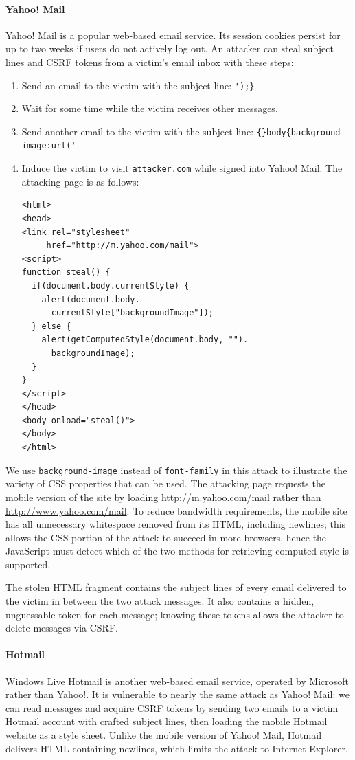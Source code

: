 \documentclass{acm_proc_article-sp}
\begin{document}
\paragraph{Yahoo! Mail}
Yahoo! Mail is a popular web-based email service.  Its session cookies
persist for up to two weeks if users do not actively log out.  An
attacker can steal subject lines and CSRF tokens from a victim's email
inbox with these steps:

\begin{enumerate}
\item Send an email to the victim with the subject line:
  \verb|');}|
\item Wait for some time while the victim receives other messages.
\item Send another email to the victim with the subject line:
  \verb|{}body{background-image:url('|
\item Induce the victim to visit \texttt{attacker.com} while signed
  into Yahoo! Mail.  The attacking page is as follows:
\begin{verbatim}
<html>
<head>
<link rel="stylesheet"
     href="http://m.yahoo.com/mail">
<script>
function steal() {
  if(document.body.currentStyle) {
    alert(document.body.
      currentStyle["backgroundImage"]);
  } else {
    alert(getComputedStyle(document.body, "").
      backgroundImage);
  }
}
</script>
</head>
<body onload="steal()">
</body>
</html>
\end{verbatim}
\end{enumerate}

We use \texttt{background-image} instead of \texttt{font-family} in
this attack to illustrate the variety of CSS properties that can be
used.  The attacking page requests the mobile version of the site by
loading \url{http://m.yahoo.com/mail} rather than
\url{http://www.yahoo.com/mail}.  To reduce bandwidth requirements,
the mobile site has all unnecessary whitespace removed from its HTML,
including newlines; this allows the CSS portion of the attack to
succeed in more browsers, hence the JavaScript must detect which of
the two methods for retrieving computed style is supported.

The stolen HTML fragment contains the subject lines of every email
delivered to the victim in between the two attack messages.  It also
contains a hidden, unguessable token for each message; knowing these
tokens allows the attacker to delete messages via CSRF.

\paragraph{Hotmail}
Windows Live Hotmail is another web-based email service, operated by
Microsoft rather than Yahoo!.  It is vulnerable to nearly the same
attack as Yahoo! Mail: we can read messages and acquire CSRF tokens by
sending two emails to a victim Hotmail account with crafted subject
lines, then loading the mobile Hotmail website as a style sheet.
Unlike the mobile version of Yahoo! Mail, Hotmail delivers HTML
containing newlines, which limits the attack to Internet Explorer.
\end{document}
